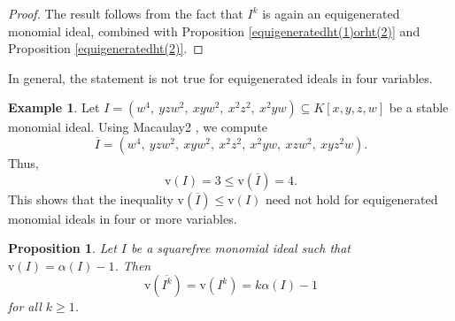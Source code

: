 \documentclass[11pt,reqno,a4paper]{amsart}
\newtheorem{proposition}[theorem]{Proposition}
\theoremstyle{definition}
\newtheorem{example}[theorem]{Example}
\begin{document}
\begin{proof}
The result follows from the fact that \(I^k\) is again an equigenerated monomial ideal, combined with Proposition \ref{equigeneratedht(1)orht(2)} and Proposition \ref{equigeneratedht(2)}.
\end{proof}




\noindent In general, the statement is not true for equigenerated ideals in four variables.

\begin{example}
Let
\(
I = (w^4,\ yzw^2,\ xyw^2,\ x^2z^2,\ x^2yw) \subseteq K[x,y,z,w]
\)
be a stable monomial ideal. Using Macaulay2 \cite{GraysonStillman}, we compute
\[
\overline I = (w^4,\ yzw^2,\ xyw^2,\ x^2z^2,\ x^2yw,\ xzw^2,\ xyz^2w).
\]
Thus,
\[
\mathrm{v}(I) = 3 \le \mathrm{v}(\overline I) = 4.
\]
This shows that the inequality \(\mathrm{v}(\overline I) \le \mathrm{v}(I)\) need not hold for equigenerated monomial ideals in four or more variables.
\end{example}




\begin{proposition}
\label{prop:v-stability-squarefree}
Let \(I\) be a squarefree monomial ideal such that \(\mathrm{v}(I) = \alpha(I) - 1\). Then
\[
\mathrm{v}(\overline{I^k}) = \mathrm{v}(I^k) = k\alpha(I) - 1
\]
for all \(k \ge 1\).
\end{proposition}
\end{document}
